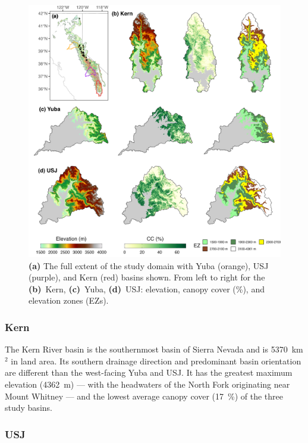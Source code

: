 \begin{figure}[t]
\centering
\includegraphics[width=14cm]{figures/ch2_figs/kuy_study_area_v3.png}
\caption{\textbf{(a)} The full extent of the study domain with Yuba (orange), USJ (purple), and Kern (red) basins shown. From left to right for the \textbf{(b)}~Kern, \textbf{(c)}~Yuba, \textbf{(d)}~USJ: elevation, canopy cover (\%), and elevation zones (EZs).}
\label{fig:kuy_study_area}
\end{figure}

\hypertarget{ch2-sa-3}{\subsubsection{Kern}\label{ch2-sa-3}}

The Kern River basin is the southernmost basin of Sierra Nevada and is 5370~km$^{2}$ in land area. Its southern drainage direction and predominant basin orientation are different than the west-facing Yuba and USJ. It has the greatest maximum elevation (4362~m) --- with the headwaters of the North Fork originating near Mount Whitney --- and the lowest average canopy cover (17~\%) of the three study basins. 


\hypertarget{ch2-sa-2}{\subsubsection{USJ}\label{ch2-sa-2}}

